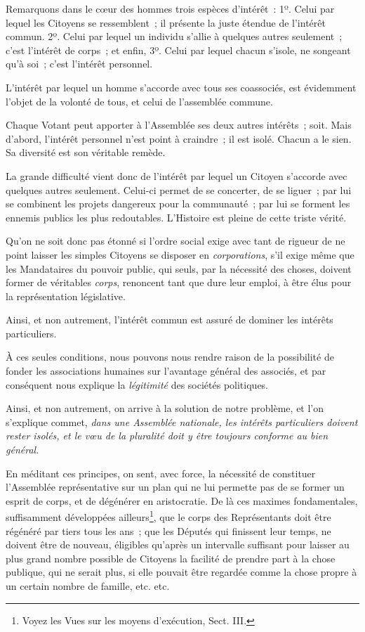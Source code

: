 \documentclass[french,twoside]{book} %
\begin{document}
Remarquons dans le cœur des hommes trois espèces d’intérêt : 1º. Celui par lequel les Citoyens se ressemblent ; il présente la juste étendue de l’intérêt commun. 2º. Celui par lequel un individu s’allie à quelques autres seulement ; c’est l’intérêt de corps ; et enfin, 3º. Celui par lequel chacun s’isole, ne songeant qu’à soi ; c’est l’intérêt personnel.\par
L’intérêt par lequel un homme s’accorde avec tous ses coassociés, est évidemment l’objet de la volonté de tous, et celui de l’assemblée commune.\par
Chaque Votant peut apporter à l’Assemblée ses deux autres intérêts ; soit. Mais d’abord, l’intérêt personnel n’est point à craindre ; il est isolé. Chacun a le sien. Sa diversité est son véritable remède.\par
La grande difficulté vient donc de l’intérêt par lequel un Citoyen s’accorde avec quelques autres seulement. Celui-ci permet de se concerter, de se liguer ; par lui se combinent les projets dangereux pour la communauté ; par lui se forment les ennemis publics les plus redoutables. L’Histoire est pleine de cette triste vérité.\par
Qu’on ne soit donc pas étonné si l’ordre social exige avec tant de rigueur de ne point laisser les simples Citoyens se disposer en {\itshape corporations}, s’il exige même que les Mandataires du pouvoir public, qui seuls, par la nécessité des choses, doivent former de véritables {\itshape corps}, renoncent tant que dure leur emploi, à être élus pour la représentation législative.\par
Ainsi, et non autrement, l’intérêt commun est assuré de dominer les intérêts particuliers.\par
À ces seules conditions, nous pouvons nous rendre raison de la possibilité de fonder les associations humaines sur l’avantage général des associés, et par conséquent nous explique la {\itshape légitimité} des sociétés politiques.\par
Ainsi, et non autrement, on arrive à la solution de notre problème, et l’on s’explique commet, {\itshape dans une Assemblée nationale, les intérêts particuliers doivent rester isolés, et le vœu de la pluralité doit y être toujours conforme au bien général.}\par
En méditant ces principes, on sent, avec force, la nécessité de constituer l’Assemblée représentative sur un plan qui ne lui permette pas de se former un esprit de corps, et de dégénérer en aristocratie. De là ces maximes fondamentales, suffisamment développées ailleurs\footnote{Voyez les Vues sur les moyens d’exécution, Sect. III.}, que le corps des Représentants doit être régénéré par tiers tous les ans ; que les Députés qui finissent leur temps, ne doivent être de nouveau, éligibles qu’après un intervalle suffisant pour laisser au plus grand nombre possible de Citoyens la facilité de prendre part à la chose publique, qui ne serait plus, si elle pouvait être regardée comme la chose propre à un certain nombre de famille, etc. etc.\par
\end{document}
